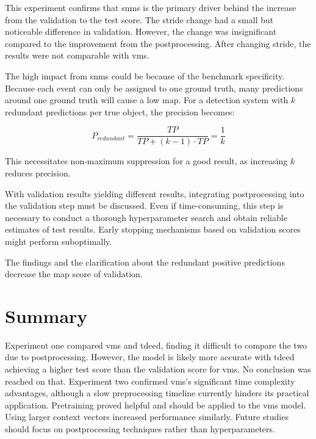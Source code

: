 This experiment confirms that \acrshort{snms} is the primary driver behind the increase from the validation to the test score. The stride change had a small but noticeable difference in validation. However, the change was insignificant compared to the improvement from the postprocessing. After changing stride, the results were not comparable with \acrshort{vms}. 

The high impact from \acrshort{snms} could be because of the benchmark specificity. Because each event can only be assigned to one ground truth, many predictions around one ground truth will cause a low \acrlong{map}. For a detection system with $k$ redundant predictions per true object, the precision becomes:

\[P_{redundant} = \frac{TP}{TP + (k-1) \cdot TP} = \frac{1}{k}\]

This necessitates non-maximum suppression for a good result, as increasing $k$ reduces precision. 

With validation results yielding different results, integrating postprocessing into the validation step must be discussed. Even if time-consuming, this step is necessary to conduct a thorough hyperparameter search and obtain reliable estimates of test results. Early stopping mechanisms based on validation scores might perform suboptimally. 

The findings and the clarification about the redundant positive predictions decrease the \acrshort{map} score of validation.

\section{Summary}

Experiment one compared \acrfull{vms} and \acrfull{tdeed}, finding it difficult to compare the two due to postprocessing. However, the model is likely more accurate with \acrshort{tdeed} achieving a higher test score than the validation score for \acrshort{vms}. No conclusion was reached on that. Experiment two confirmed \acrshort{vms}'s significant time complexity advantages, although a slow preprocessing timeline currently hinders its practical application. Pretraining proved helpful and should be applied to the \acrshort{vms} model. Using larger context vectors increased performance similarly. Future studies should focus on postprocessing techniques rather than hyperparameters. 
